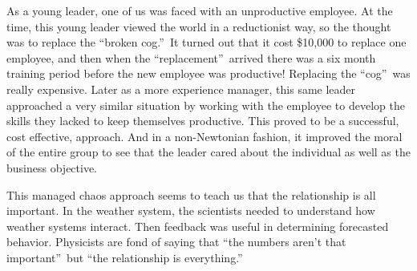 \documentclass{article}
\begin{document}
As a young leader, one of us was faced with an unproductive employee. At the
time, this young leader viewed the world in a reductionist way, so the
thought was to replace the \textquotedblleft broken cog.\textquotedblright\
It turned out that it cost \$10,000 to replace one employee, and then when
the \textquotedblleft replacement\textquotedblright\ arrived there was a six
month training period before the new employee was productive! Replacing the
\textquotedblleft cog\textquotedblright\ was really expensive. Later as a
more experience manager, this same leader approached a very similar
situation by working with the employee to develop the skills they lacked to
keep themselves productive. This proved to be a successful, cost effective,
approach. And in a non-Newtonian fashion, it improved the moral of the
entire group to see that the leader cared about the individual as well as
the business objective.

This managed chaos approach seems to teach us that the relationship is all
important. In the weather system, the scientists needed to understand how
weather systems interact. Then feedback was useful in determining forecasted
behavior. Physicists are fond of saying that \textquotedblleft the numbers
aren't that important\textquotedblright\ but \textquotedblleft the
relationship is everything.\textquotedblright
\end{document}

